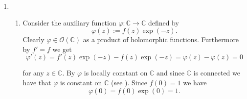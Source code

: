\begin{enumerate}[label = \textbf{Exercise \arabic*.},wide = 0pt, itemsep=1.5ex]
	\begin{proof}
		Proof by induction over $k \in \mathbb{N}$. The statement obviously holds for $k = 0$. Assume the statement holds for $k \in \mathbb{N}$. Then we get
		\begin{align*}
			\frac{\d^{k+1}}{\d z^{k+1}} \frac{1}{1 - z} &= \frac{\d}{\d z} \sbr[3]{\frac{\d^k}{\d z^k} \frac{1}{1 - z}}\\
			&= \frac{\d}{\d z} \frac{k!}{(1 - z)^{k + 1}}\\
			&= k!\frac{(k + 1)(1 - z)^k}{(1 - z)^{2k + 2}}\\
			&= \frac{(k + 1)!}{(1 - z)^{k + 2}}.
		\end{align*}
	\end{proof}

	By lemma \ref{lem:ind} and the formula for the $k$-th derivative of a power series \cite[110]{remmert2002funktionentheorie} applied to the \emph{geometric series} $\sum_{\nu = 0}^\infty z^\nu$ we get
	\begin{equation}
		\frac{k!}{(1 - z)^{k + 1}} = \frac{\d^k}{\d z^k} \frac{1}{1 - z} = \sum_{\nu = k}^\infty k!{\nu \choose k}z^{\nu - k}
		\label{eq:der}
	\end{equation}

	\noindent for $k \in \mathbb{N}$. Dividing (\ref{eq:der}) by $k!$ yields
	\begin{equation}
		\sum_{\nu = k}^\infty {\nu \choose k}z^{\nu - k} = \frac{1}{(1 - z)^{k + 1}}.
	\end{equation}
\item
	~
	\begin{enumerate}[label = (\alph*),wide = 0pt, itemsep=1.5ex]
		\item Consider the auxiliary function $\varphi: \mathbb{C} \to \mathbb{C}$ defined by
			\begin{equation}
				\varphi(z) := f(z)\exp(-z).
			\end{equation}
		Clearly $\varphi \in \mathcal{O}(\mathbb{C})$ as a product of holomorphic functions. Furthermore by $f' = f$ we get 
	\begin{equation}
		\varphi'(z) = f'(z)\exp(-z) - f(z)\exp(-z) = \varphi(z) - \varphi(z) = 0
		\label{eq:const}
	\end{equation}

	\noindent for any $z \in \mathbb{C}$. By \cite[55]{remmert2002funktionentheorie} $\varphi$ is locally constant on $\mathbb{C}$ and since $\mathbb{C}$ is connected we have that $\varphi$ is constant on $\mathbb{C}$ (see \cite[35]{remmert2002funktionentheorie}). Since $f(0) = 1$ we have
	\begin{equation}
		\varphi(0) = f(0)\exp(0) = 1.
	\end{equation}


\end{enumerate}
\end{enumerate}
